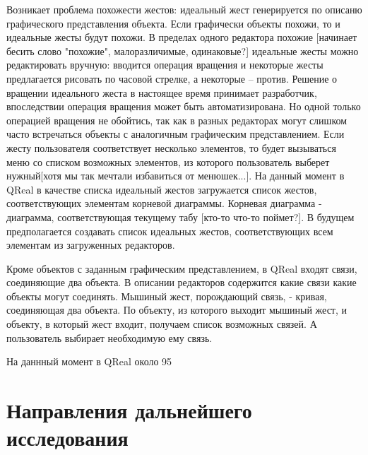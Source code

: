 \documentclass[a5paper]{article}
\begin{document}
Возникает проблема похожести жестов: идеальный жест генерируется по описаню графического представления объекта. Если графически объекты похожи, то и идеальные жесты будут похожи. В пределах одного редактора похожие [начинает бесить слово "похожие", малоразличимые, одинаковые?] идеальные жесты можно редактировать вручную: вводится операция вращения и некоторые жесты предлагается рисовать по часовой стрелке, а некоторые -- против. Решение о вращении идеального жеста в настоящее время принимает разработчик, впоследствии операция вращения может быть автоматизирована. Но одной только операцией вращения не обойтись, так как в разных редакторах могут слишком часто встречаться объекты с аналогичным графическим представлением. Если жесту пользователя соответствует несколько элементов, то будет вызываться меню со списком возможных элементов, из которого пользователь выберет нужный[хотя мы так мечтали избавиться от менюшек...]. На данный момент в QReal в качестве списка идеальный жестов загружается список жестов, соответствующих элементам корневой диаграммы. Корневая диаграмма - диаграмма, соответствующая текущему табу [кто-то что-то поймет?]. В будущем предполагается создавать список идеальных жестов, соответствующих всем элементам из загруженных редакторов.

Кроме объектов с заданным графическим представлением, в QReal входят связи, соединяющие два объекта. В описании редакторов содержится какие связи какие объекты могут соединять. Мышиный жест, порождающий связь, - кривая, соединяющая два объекта. По объекту, из которого выходит мышиный жест, и объекту, в который жест входит, получаем список возможных связей. А пользователь выбирает необходимую ему связь.

На даннный момент в QReal около 95 %

\section{Направления дальнейшего исследования}
\end{document}
